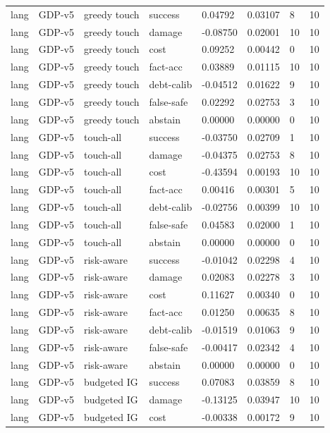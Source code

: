 \documentclass{article}
\begin{document}
\begin{center}
\begin{longtable}{llllllll}
lang & GDP-v5 & greedy touch & success & 0.04792 & 0.03107 & 8 & 10 \\
lang & GDP-v5 & greedy touch & damage & -0.08750 & 0.02001 & 10 & 10 \\
lang & GDP-v5 & greedy touch & cost & 0.09252 & 0.00442 & 0 & 10 \\
lang & GDP-v5 & greedy touch & fact-acc & 0.03889 & 0.01115 & 10 & 10 \\
lang & GDP-v5 & greedy touch & debt-calib & -0.04512 & 0.01622 & 9 & 10 \\
lang & GDP-v5 & greedy touch & false-safe & 0.02292 & 0.02753 & 3 & 10 \\
lang & GDP-v5 & greedy touch & abstain & 0.00000 & 0.00000 & 0 & 10 \\
lang & GDP-v5 & touch-all & success & -0.03750 & 0.02709 & 1 & 10 \\
lang & GDP-v5 & touch-all & damage & -0.04375 & 0.02753 & 8 & 10 \\
lang & GDP-v5 & touch-all & cost & -0.43594 & 0.00193 & 10 & 10 \\
lang & GDP-v5 & touch-all & fact-acc & 0.00416 & 0.00301 & 5 & 10 \\
lang & GDP-v5 & touch-all & debt-calib & -0.02756 & 0.00399 & 10 & 10 \\
lang & GDP-v5 & touch-all & false-safe & 0.04583 & 0.02000 & 1 & 10 \\
lang & GDP-v5 & touch-all & abstain & 0.00000 & 0.00000 & 0 & 10 \\
lang & GDP-v5 & risk-aware & success & -0.01042 & 0.02298 & 4 & 10 \\
lang & GDP-v5 & risk-aware & damage & 0.02083 & 0.02278 & 3 & 10 \\
lang & GDP-v5 & risk-aware & cost & 0.11627 & 0.00340 & 0 & 10 \\
lang & GDP-v5 & risk-aware & fact-acc & 0.01250 & 0.00635 & 8 & 10 \\
lang & GDP-v5 & risk-aware & debt-calib & -0.01519 & 0.01063 & 9 & 10 \\
lang & GDP-v5 & risk-aware & false-safe & -0.00417 & 0.02342 & 4 & 10 \\
lang & GDP-v5 & risk-aware & abstain & 0.00000 & 0.00000 & 0 & 10 \\
lang & GDP-v5 & budgeted IG & success & 0.07083 & 0.03859 & 8 & 10 \\
lang & GDP-v5 & budgeted IG & damage & -0.13125 & 0.03947 & 10 & 10 \\
lang & GDP-v5 & budgeted IG & cost & -0.00338 & 0.00172 & 9 & 10 \\

\end{longtable}
\end{center}
\end{document}
